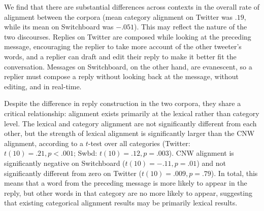 \documentclass[11pt]{article}
\begin{document}
We find that there are substantial differences across contexts in the overall rate of alignment between the corpora (mean category alignment on Twitter was $.19$, while its mean on Switchboard was $-.051$). This may reflect the nature of the two discourses. Replies on Twitter are composed while looking at the preceding message, encouraging the replier to take more account of the other tweeter's words, and a replier can draft and edit their reply to make it better fit the conversation.  Messages on Switchboard, on the other hand, are evanescent, so a replier must compose a reply without looking back at the message, without editing, and in real-time.  %

Despite the difference in reply construction in the two corpora, they share a critical relationship: alignment exists primarily at the lexical rather than category level.  The lexical and category alignment are not significantly different from each other, but the strength of lexical alignment is significantly larger than the CNW alignment, according to a $t$-test over all categories (Twitter: $t(10)=.21, p<.001$; Swbd: $t(10)=.12,p=.003$). CNW alignment is significantly negative on Switchboard ($t(10)=-.11, p=.01$) and not significantly different from zero on Twitter ($t(10)=.009, p=.79$). In total, this means that a word from the preceding message is more likely to appear in the reply, but other words in that category are no more likely to appear, suggesting that existing categorical alignment results may be primarily lexical results.

\end{document}
